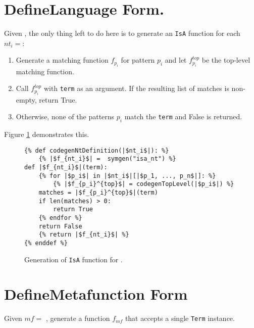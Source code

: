 \section{DefineLanguage Form.}
Given \DefineLanguage, the only thing left to do here is to generate an \texttt{IsA} function for each $nt_i=$\space\NtDefinition:
\begin{enumerate}
\item Generate a matching function $f_{p_i}$ for pattern $p_i$ and let $f_{p_i}^{top}$ be the top-level matching function.
\item Call $f_{p_i}^{top}$ with \texttt{term} as an argument. If the resulting list of matches is non-empty, return True.
\item Otherwise, none of the patterns $p_i$ match the \texttt{term} and False is returned.
\end{enumerate}

Figure \ref{codegen-ntdef} demonstrates this.

\begin{figure}
\begin{verbatim}
{% def codegenNtDefinition(|$nt_i$|): %}
	{% |$f_{nt_i}$| =  symgen("isa_nt") %}
def |$f_{nt_i}$|(term):
	{% for |$p_i$| in |$nt_i$|[|$p_1, ..., p_n$|]: %}
		{% |$f_{p_i}^{top}$| = codegenTopLevel(|$p_i$|) %}
	matches = |$f_{p_i}^{top}$|(term)
	if len(matches) > 0:
		return True
	{% endfor %}
	return False
	{% return |$f_{nt_i}$| %}
{% enddef %}
\end{verbatim}
\caption{Generation of \texttt{IsA} function for \NtDefinitionNoArgs.}
\label{codegen-ntdef}
\end{figure}

\section{DefineMetafunction Form}

Given $mf=$ \DefineMetafunction, generate a function $f_{mf}$ that accepts a single \texttt{Term} instance.

